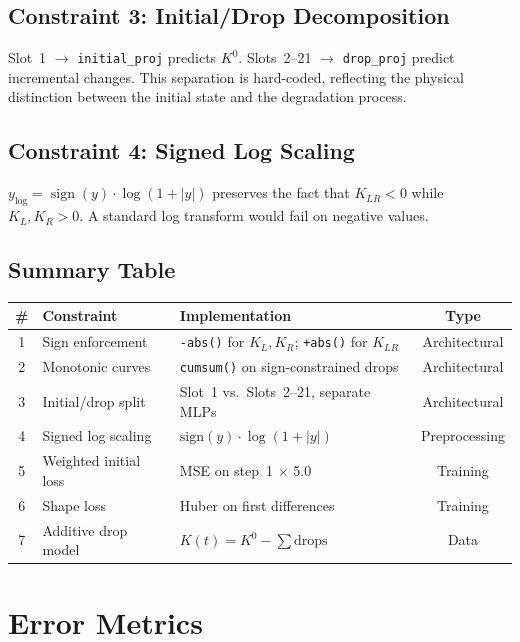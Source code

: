 \documentclass[11pt,a4paper]{article}
\begin{document}
\subsection{Constraint 3: Initial/Drop Decomposition}

Slot~1 $\to$ \texttt{initial\_proj} predicts $K^0$. Slots~2--21 $\to$ \texttt{drop\_proj} predict incremental changes. This separation is hard-coded, reflecting the physical distinction between the initial state and the degradation process.

\subsection{Constraint 4: Signed Log Scaling}

$y_{\log} = \operatorname{sign}(y) \cdot \log(1 + |y|)$ preserves the fact that $K_{LR} < 0$ while $K_L, K_R > 0$. A standard log transform would fail on negative values.

\subsection{Summary Table}

\begin{center}
\small
\begin{tabularx}{\textwidth}{@{}clXc@{}}
\toprule
\textbf{\#} & \textbf{Constraint} & \textbf{Implementation} & \textbf{Type} \\
\midrule
1 & Sign enforcement & \texttt{-abs()} for $K_L, K_R$; \texttt{+abs()} for $K_{LR}$ & Architectural \\
2 & Monotonic curves & \texttt{cumsum()} on sign-constrained drops & Architectural \\
3 & Initial/drop split & Slot~1 vs.\ Slots~2--21, separate MLPs & Architectural \\
4 & Signed log scaling & $\text{sign}(y) \cdot \log(1+|y|)$ & Preprocessing \\
5 & Weighted initial loss & MSE on step~1 $\times$ 5.0 & Training \\
6 & Shape loss & Huber on first differences & Training \\
7 & Additive drop model & $K(t) = K^0 - \sum\text{drops}$ & Data \\
\bottomrule
\end{tabularx}
\end{center}

\section{Error Metrics}
\end{document}

